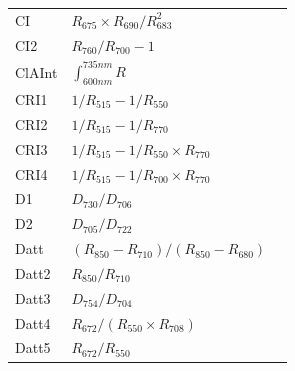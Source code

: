 \documentclass[letterpaper, peerreview, draftcls]{IEEEtran}
\begin{document}
\begin{xtabular*}{0.3\textwidth}{lll}
	CI              & $R_{675}\times R_{690}/R_{683}^2$                                                                   & \cite{zarco-tejada2003a} \\
	CI2             & $R_{760}/R_{700}-1$                                                                                 & \cite{gitelson2003}     \\
	ClAInt          & $\int_{600 nm}^{735 nm} R$                                                                          & \cite{oppelt2004}   \\
	CRI1            & $1/R_{515}-1/R_{550}$                                                                               & \cite{gitelson2003}     \\
	CRI2            & $1/R_{515}-1/R_{770}$                                                                               & \cite{gitelson2003}     \\
	CRI3            & $1/R_{515}-1/R_{550}\times R_{770}$                                                                 & \cite{gitelson2003}     \\
	CRI4            & $1/R_{515}-1/R_{700}\times R_{770}$                                                                 & \cite{gitelson2003}     \\
	D1              & $D_{730}/D_{706}$                                                                                   & \cite{zarco-tejada2003a} \\
	D2              & $D_{705}/D_{722}$                                                                                   & \cite{zarco-tejada2003a} \\
	Datt            & $(R_{850}-R_{710})/(R_{850}-R_{680})$                                                               & \cite{datt1999}               \\
	Datt2           & $R_{850}/R_{710}$                                                                                   & \cite{datt1999}               \\
	Datt3           & $D_{754}/D_{704}$                                                                                   & \cite{datt1999}               \\
	Datt4           & $R_{672}/(R_{550} \times R_{708})$                                                                  & \cite{datt1998}                \\
	Datt5           & $R_{672}/R_{550}$                                                                                   & \cite{datt1998}                \\

\end{xtabular*}
\end{document}
